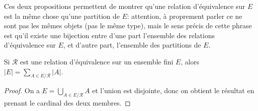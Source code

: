 Ces deux propositions permettent de montrer qu'\og une relation d'équivalence sur $E$ est la même chose qu'une partition de $E$\fg : attention, à proprement parler ce ne sont pas les mêmes objets (pas le même type), mais le sens précis de cette phrase est qu'il existe une bijection entre d'une part l'ensemble des relations d'équivalence sur $E$, et d'autre part, l'ensemble des partitions de $E$.

\begin{corollaire}
Si $\mathcal R$ est une relation d'équivalence sur un ensemble fini $E$, alors $|E| = \sum_{A\in E/\mathcal R} |A|$.
\end{corollaire}
\begin{proof}
On a  $E= \bigcup_{A\in E/\mathcal R} A$ et l'union est disjointe, donc on obtient le résultat en prenant le cardinal des deux membres.
\end{proof}